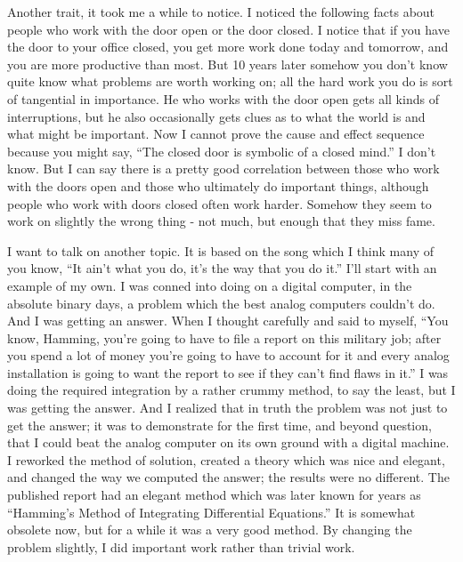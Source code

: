 \documentclass{article}
\begin{document}
Another trait, it took me a while to notice. I noticed the following facts about people who work with the door open or the door closed. I notice that if you have the door to your office closed, you get more work done today and tomorrow, and you are more productive than most. But 10 years later somehow you don't know quite know what problems are worth working on; all the hard work you do is sort of tangential in importance. He who works with the door open gets all kinds of interruptions, but he also occasionally gets clues as to what the world is and what might be important. Now I cannot prove the cause and effect sequence because you might say, ``The closed door is symbolic of a closed mind.'' I don't know. But I can say there is a pretty good correlation between those who work with the doors open and those who ultimately do important things, although people who work with doors closed often work harder. Somehow they seem to work on slightly the wrong thing - not much, but enough that they miss fame.

I want to talk on another topic. It is based on the song which I think many of you know, ``It ain't what you do, it's the way that you do it.'' I'll start with an example of my own. I was conned into doing on a digital computer, in the absolute binary days, a problem which the best analog computers couldn't do. And I was getting an answer. When I thought carefully and said to myself, ``You know, Hamming, you're going to have to file a report on this military job; after you spend a lot of money you're going to have to account for it and every analog installation is going to want the report to see if they can't find flaws in it.'' I was doing the required integration by a rather crummy method, to say the least, but I was getting the answer. And I realized that in truth the problem was not just to get the answer; it was to demonstrate for the first time, and beyond question, that I could beat the analog computer on its own ground with a digital machine. I reworked the method of solution, created a theory which was nice and elegant, and changed the way we computed the answer; the results were no different. The published report had an elegant method which was later known for years as ``Hamming's Method of Integrating Differential Equations.'' It is somewhat obsolete now, but for a while it was a very good method. By changing the problem slightly, I did important work rather than trivial work.
\end{document}
